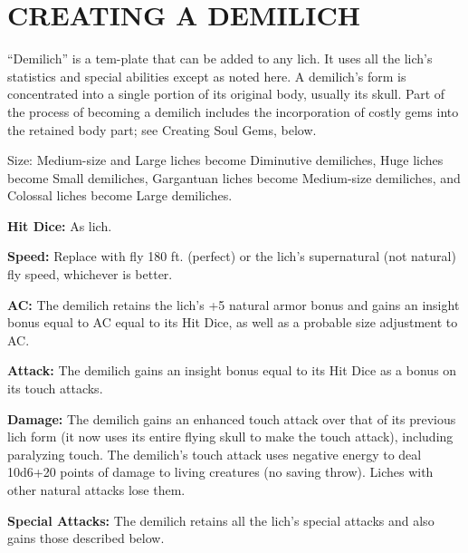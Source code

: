 \documentclass{article}
\begin{document}
\vspace{12pt}
\section*{CREATING A DEMILICH }

``Demilich'' is a tem-plate that can be added to any lich. It uses all the lich's 
statistics and special abilities except as noted here. A demilich's form is concentrated 
into a single portion of its original body, usually its skull. Part of the process 
of becoming a demilich includes the incorporation of costly gems into the retained 
body part; see Creating Soul Gems, below. 

Size: Medium-size and Large liches become Diminutive demiliches, Huge liches become 
Small demiliches, Gargantuan liches become Medium-size demiliches, and Colossal 
liches become Large demiliches. 

\textbf{Hit Dice:} As lich. 

\textbf{Speed:} Replace with fly 180 ft. (perfect) or the lich's supernatural (not 
natural) fly speed, whichever is better. 

\textbf{AC:} The demilich retains the lich's +5 natural armor bonus and gains an 
insight bonus equal to AC equal to its Hit Dice, as well as a probable size adjustment 
to AC. 

\textbf{Attack:} The demilich gains an insight bonus equal to its Hit Dice as a 
bonus on its touch attacks.

\textbf{Damage:} The demilich gains an enhanced touch attack over that of its previous 
lich form (it now uses its entire flying skull to make the touch attack), including 
paralyzing touch. The demilich's touch attack uses negative energy to deal 10d6+20 
points of damage to living creatures (no saving throw). Liches with other natural 
attacks lose them. 

\textbf{Special Attacks:} The demilich retains all the lich's special attacks and 
also gains those described below. 
\end{document}
